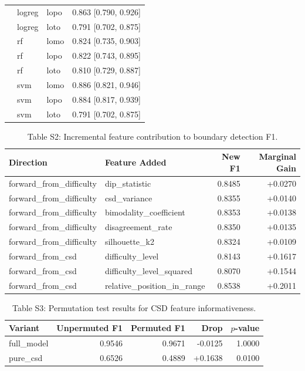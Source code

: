\documentclass[11pt]{article}
\begin{document}
\begin{table}[h]
\begin{tabular}{l|l|l|r}
 & logreg & lopo & 0.863 [0.790, 0.926] \\
 & logreg & loto & 0.791 [0.702, 0.875] \\
 & rf & lomo & 0.824 [0.735, 0.903] \\
 & rf & lopo & 0.822 [0.743, 0.895] \\
 & rf & loto & 0.810 [0.729, 0.887] \\
 & svm & lomo & 0.886 [0.821, 0.946] \\
 & svm & lopo & 0.884 [0.817, 0.939] \\
 & svm & loto & 0.791 [0.702, 0.875] \\
\bottomrule
\end{tabular}
\end{table}

\begin{table}[h]\centering\small
\caption{Table S2: Incremental feature contribution to boundary detection F1.}
\label{tab:incremental}
\begin{tabular}{l|l|r|r}
\toprule
Direction & Feature Added & New F1 & Marginal Gain \\
\midrule
forward\_from\_difficulty & dip\_statistic & 0.8485 & +0.0270 \\
forward\_from\_difficulty & csd\_variance & 0.8355 & +0.0140 \\
forward\_from\_difficulty & bimodality\_coefficient & 0.8353 & +0.0138 \\
forward\_from\_difficulty & disagreement\_rate & 0.8350 & +0.0135 \\
forward\_from\_difficulty & silhouette\_k2 & 0.8324 & +0.0109 \\
forward\_from\_csd & difficulty\_level & 0.8143 & +0.1617 \\
forward\_from\_csd & difficulty\_level\_squared & 0.8070 & +0.1544 \\
forward\_from\_csd & relative\_position\_in\_range & 0.8538 & +0.2011 \\
\bottomrule
\end{tabular}
\end{table}

\begin{table}[h]\centering\small
\caption{Table S3: Permutation test results for CSD feature informativeness.}
\label{tab:permutation}
\begin{tabular}{l|r|r|r|r}
\toprule
Variant & Unpermuted F1 & Permuted F1 & Drop & $p$-value \\
\midrule
full\_model & 0.9546 & 0.9671 & -0.0125 & 1.0000 \\
pure\_csd & 0.6526 & 0.4889 & +0.1638 & 0.0100 \\
\bottomrule
\end{tabular}
\end{table}
\end{document}
